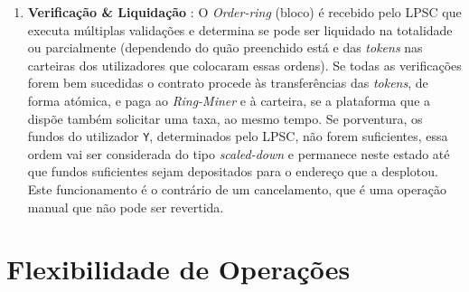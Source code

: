 \documentclass[UTF8,nofonts]{article}
\makeatletter
\newenvironment{figurehere}
 {\def\@captype{figure}}
 {}
\makeatother
\begin{document}
\begin{multicols}{2}
\begin{enumerate}

\item \textbf{Verificação \& Liquidação }: O \textit{Order-ring} (bloco) é recebido pelo LPSC que executa múltiplas validações e determina se pode ser liquidado na totalidade ou parcialmente (dependendo do quão preenchido está e das \textit{tokens} nas carteiras dos utilizadores que colocaram essas ordens). Se todas as verificações forem bem sucedidas o contrato procede às transferências das \textit{tokens}, de forma atómica, e paga ao \textit{Ring-Miner} e à carteira, se a plataforma que a dispõe também solicitar uma taxa, ao mesmo tempo. Se porventura, os fundos do utilizador \verb|Y|, determinados pelo LPSC, não forem suficientes, essa ordem vai ser considerada do tipo \textit{scaled-down} e permanece neste estado até que fundos suficientes sejam depositados para o endereço que a desplotou. Este funcionamento é o contrário de um cancelamento, que é uma operação manual que não pode ser revertida.

\end{enumerate}

%
%
%






\section{Flexibilidade de Operações\label{sec:business_model)}}


\end{multicols}
\end{document}
